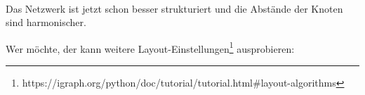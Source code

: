 \documentclass[11pt]{article}
\begin{document}
    \begin{center}
    \end{center}
    { \hspace*{\fill} \\}
    
    \begin{tcolorbox}[breakable, size=fbox, boxrule=1pt, pad at break*=1mm,colback=cellbackground, colframe=cellborder]
\begin{Verbatim}[commandchars=\\\{\}]

\end{Verbatim}
\end{tcolorbox}

    Das Netzwerk ist jetzt schon besser strukturiert und die Abstände der
Knoten sind harmonischer.

Wer möchte, der kann weitere Layout-Einstellungen\footnote{https://igraph.org/python/doc/tutorial/tutorial.html\#layout-algorithms}
ausprobieren:
\end{document}
